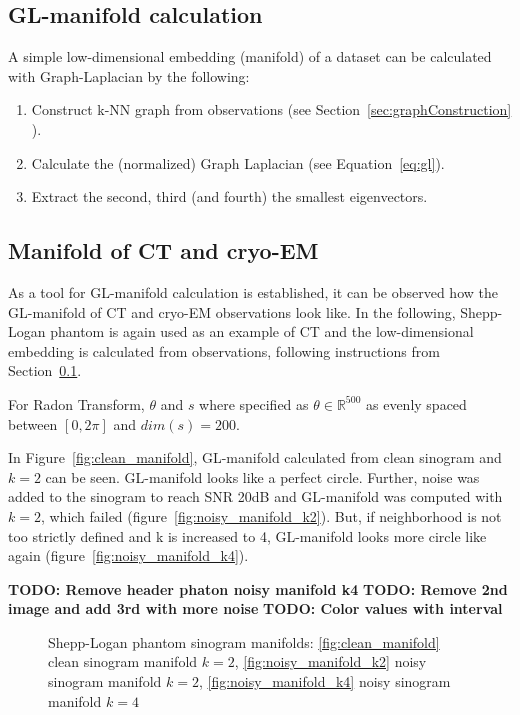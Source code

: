 \subsection{GL-manifold calculation}
\label{sec:manifold_calculation}
A simple low-dimensional embedding (manifold) of a dataset can be calculated with Graph-Laplacian 
by the following:

\begin{enumerate}
    \item Construct k-NN graph from observations (see Section~\ref{sec:graphConstruction} \textit{}).
    \item Calculate the (normalized) Graph Laplacian (see Equation~\ref{eq:gl}).
    \item Extract the second, third (and fourth) the smallest eigenvectors.
\end{enumerate}

\subsection{Manifold of CT and cryo-EM}
\label{sec:manifold_ct_cryoEM}
As a tool for GL-manifold calculation is established, it can be observed how the GL-manifold of CT and cryo-EM observations look like.
In the following, Shepp-Logan phantom is again used as an example of CT
and the low-dimensional embedding is calculated from observations, following instructions from 
Section~\ref{sec:manifold_calculation}.

For Radon Transform, $\theta$ and $s$ where specified as $\theta \in \mathbb{R}^{500}$ as evenly spaced
between $[0, 2 \pi]$ and $dim(s) = 200$. 

In Figure~\ref{fig:clean_manifold}, GL-manifold calculated from clean sinogram and $k=2$ can be seen.
GL-manifold looks like a perfect circle. Further, noise was added to the sinogram 
to reach SNR 20dB and GL-manifold was computed with $k=2$, which failed (figure~\ref{fig:noisy_manifold_k2}).
But, if neighborhood is not too strictly defined and k is increased to 4, GL-manifold looks more circle like again
(figure~\ref{fig:noisy_manifold_k4}).

\textbf{TODO: Remove header phaton noisy manifold k4}
\textbf{TODO: Remove 2nd image and add 3rd with more noise}
\textbf{TODO: Color values with interval }

\begin{figure}[H]
    \centering
    \hfill
        \hfill
    \hfill
    \hfill
    \caption{Shepp-Logan phantom sinogram manifolds:
    \ref{fig:clean_manifold} clean sinogram manifold $k=2$,
    \ref{fig:noisy_manifold_k2} noisy sinogram manifold $k=2$,
    \ref{fig:noisy_manifold_k4} noisy sinogram manifold $k=4$
    }
\end{figure}

